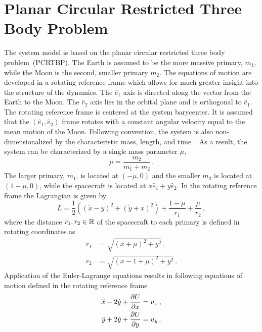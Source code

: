 \documentclass[preprint]{elsarticle}
\begin{document}
\section{Planar Circular Restricted Three Body Problem}\label{sec:pcrtbp}
The system model is based on the planar circular restricted three body problem~(PCRTBP).
The Earth is assumed to be the more massive primary, \( m_1 \), while the Moon is the second, smaller primary \( m_2\).
The equations of motion are developed in a rotating reference frame which allows for much greater insight into the structure of the dynamics.
The \( \hat{e}_1 \) axis is directed along the vector from the Earth to the Moon.
The \( \hat{e}_2 \) axis lies in the orbital plane and is orthogonal to \( \hat{e}_1 \).
The rotating reference frame is centered at the system barycenter.
It is assumed that the \(\left( \hat{e}_1, \hat{e}_2\right)\) frame rotates with a constant angular velocity equal to the mean motion of the Moon.
Following convention, the system is also non-dimensionalized by the characteristic mass, length, and time~\cite{koon2011}.
As a result, the system can be characterized by a single mass parameter \( \mu \),
\begin{equation}
	\mu = \frac{m_2}{m_1+m_2} \, .
	\label{eq:mass_param}
\end{equation}
The larger primary, \(m_1\), is located at \( \left(  -\mu , 0 \right)\) and the smaller \( m_2\) is located at \( \left( 1-\mu , 0 \right)\), while the spacecraft is located at \( x \hat{e}_1 + y \hat{e}_2 \).
In the rotating reference frame the Lagrangian is given by
\begin{equation}
	L = \frac{1}{2} \left( \left( \dot{x} -y \right)^2 + \left( \dot{y} + x \right)^2 \right) + \frac{1-\mu}{r_1} + \frac{\mu}{r_2}\, ,
	\label{eq:lagrangian}
\end{equation}
where the distance \( r_1, r_2 \in \mathbb{R} \) of the spacecraft to each primary is defined in rotating coordinates as
\begin{align}
	r_1 &= \sqrt{\left( x + \mu\right)^2 + y^2}\, , \\
	r_2 &= \sqrt{\left( x - 1 + \mu\right)^2 + y^2}\, .
	\label{eq:distances}
\end{align}
Application of the Euler-Lagrange equations results in following equations of motion defined in the rotating reference frame
\begin{align}
	\ddot{x} - 2 \dot{y} + \frac{\partial U}{\partial x} &= u_x \, ,\nonumber \\
	\ddot{y} + 2 \dot{y} + \frac{\partial U}{\partial y} &= u_y \, ,
	\label{eq:cont_eom}
\end{align}
\end{document}
